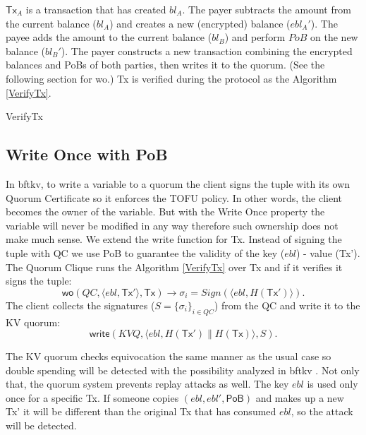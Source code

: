 \documentclass[10pt,fleqn]{article}
\begin{document}
$\textsf{Tx}_A$ is a transaction that has created $bl_A$. The payer subtracts the amount from the current balance ($bl_A$) and creates a new (encrypted) balance ($ebl_A'$). The payee adds the amount to the current balance ($bl_B$) and perform $PoB$ on the new balance ($bl_B'$). The payer constructs a new transaction combining the encrypted balances and PoBs of both parties, then writes it to the quorum. (See the following section for {\sf wo}.) \textsf{Tx} is verified during the protocol as the Algorithm \ref{VerifyTx}.

\begin{algorithm}[H]
\label{VerifyTx}
\caption{VerifyTx}
 {
   {
     {
    }
     {
    }
  }
}
\end{algorithm}

\subsection{Write Once with PoB}
In {\sf bftkv}, to write a variable to a quorum the client signs the tuple with its own Quorum Certificate so it enforces the TOFU policy. In other words, the client becomes the owner of the variable. But with the Write Once property the variable will never be modified in any way therefore such ownership does not make much sense. We extend the write function for \textsf{Tx}. Instead of signing the tuple with QC we use PoB to guarantee the validity of the key ($ebl$) - value (\textsf{Tx'}). The Quorum Clique runs the Algorithm \ref{VerifyTx} over \textsf{Tx} and if it verifies it signs the tuple:
\[
\textsf{wo}(QC, \langle ebl, \textsf{Tx}' \rangle, \textsf{Tx}) \longrightarrow \sigma_i = \textit{Sign}(\langle ebl, H(\textsf{Tx}') \rangle).
\]
The client collects the signatures ($S = \{\sigma_i\}_{i \in QC}$) from the QC and write it to the KV quorum:
\[
\textsf{write}(KVQ, \langle ebl, H(\textsf{Tx}') \parallel H(\textsf{Tx}) \rangle, S).
\]

The KV quorum checks equivocation the same manner as the usual case so double spending will be detected with the possibility analyzed in \textsf{bftkv} \cite{bftkv}. Not only that, the quorum system prevents replay attacks as well. The key $ebl$ is used only once for a specific \textsf{Tx}. If someone copies $(ebl, ebl', \textsf{PoB})$ and makes up a new \textsf{Tx'} it will be different than the original \textsf{Tx} that has consumed $ebl$, so the attack will be detected.
\end{document}
